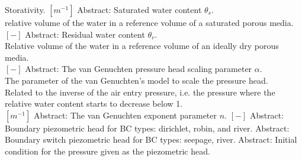 \begin{RecordType}
			{} %
			{{{Storativity. }{$[m^{-1}]$}}}
		\KeyItem
			{}
			{{Abstract}{: }}
			{\textrangle}
			{} %
			{{{Saturated water content }{$ \theta_s $}{.}\\{
relative volume of the water in a reference volume of a saturated porous media.}\\{
 }{$[-]$}}}
		\KeyItem
			{}
			{{Abstract}{: }}
			{\textrangle}
			{} %
			{{{Residual water content }{$ \theta_r $}{.}\\{
Relative volume of the water in a reference volume of an ideally dry porous media.}\\{
 }{$[-]$}}}
		\KeyItem
			{}
			{{Abstract}{: }}
			{\textrangle}
			{} %
			{{{The van Genuchten pressure head scaling parameter }{$ \alpha $}{.}\\{
The parameter of the van Genuchten's model to scale the pressure head.}\\{
Related to the inverse of the air entry pressure, i.e. the pressure where the relative water content starts to decrease below 1.}\\{
 }{$[m^{-1}]$}}}
		\KeyItem
			{}
			{{Abstract}{: }}
			{\textrangle}
			{} %
			{{{The van Genuchten exponent parameter }{$ n $}{. }{$[-]$}}}
		\KeyItem
			{}
			{{Abstract}{: }}
			{\textrangle}
			{} %
			{{{Boundary piezometric head for BC types: dirichlet, robin, and river.}}}
		\KeyItem
			{}
			{{Abstract}{: }}
			{\textrangle}
			{} %
			{{{Boundary switch piezometric head for BC types: seepage, river.}}}
		\KeyItem
			{}
			{{Abstract}{: }}
			{\textrangle}
			{} %
			{{{Initial condition for the pressure given as the piezometric head.}}}
\end{RecordType}
